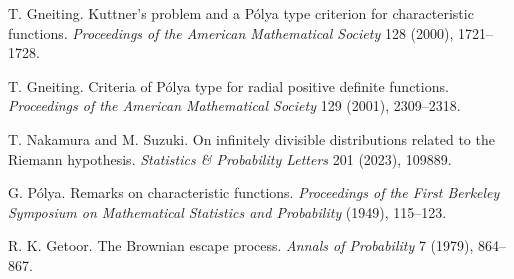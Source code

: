  T. Gneiting. Kuttner's problem and a P\'olya type criterion for characteristic functions. \emph{Proceedings of the American Mathematical Society} 128 (2000), 1721--1728.

 T. Gneiting. Criteria of P\'olya type for radial positive definite functions. \emph{Proceedings of the American Mathematical Society} 129 (2001), 2309--2318.

 T. Nakamura and M. Suzuki. On infinitely divisible distributions related to the Riemann hypothesis. \emph{Statistics \& Probability Letters} 201 (2023), 109889.

 G. P\'olya. Remarks on characteristic functions. \emph{Proceedings of the First Berkeley Symposium on Mathematical Statistics and Probability} (1949), 115--123.

 R. K. Getoor. The Brownian escape process. \emph{Annals of Probability} 7 (1979), 864--867.
